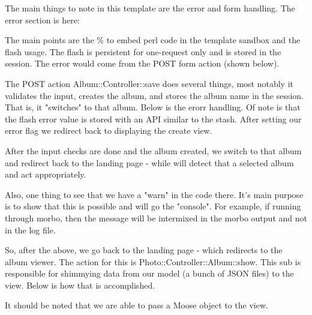 \documentclass[14pt]{extreport}
\newcommand\Small{\fontsize{10}{10.2}\selectfont}
\newcommand*\LSTfont{\Small\ttfamily\SetTracking{encoding=*}{-60}\lsstyle}
\begin{document}
The main things to note in this template are the error and form handling.  The
error section is here:



The main points are the \% to embed perl code in the template sandbox and the
flash usage.  The flash is persistent for one-request only and is stored in the
session.  The error would come from the POST form action (shown below).



The POST action Album::Controller::save does several things, most notably it
validates the input, creates the album, and stores the album name in the session. 
That is, it "switches" to that album. Below is the erorr handling.  Of note is that
the flash error value is stored with an API similar to the stash.  After setting our
error flag we redirect back to displaying the create view.



After the input checks are done and the album created, we switch to that album
and redirect back to the landing page - while will detect that a selected album
and act appropriately.



Also, one thing to see that we have a "warn" in the code there. It's main
purpose is to show that this is possible and will go the "console". For
example, if running through morbo, then the message will be intermixed in the 
morbo output and not in the log file.

So, after the above, we go back to the landing page - which redirects to the
album viewer.  The action for this is Photo::Controller::Album::show. This sub
is responsible for shimmying data from our model (a bunch of JSON files) to the
view.  Below is how that is accomplished.

It should be noted that we are able to pass a Moose object to the view.


\end{document}
